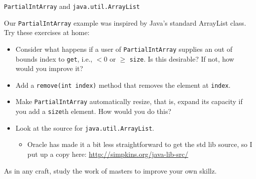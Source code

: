 \documentclass{beamer}
\begin{document}
\begin{frame}[fragile]{{\tt PartialIntArray} and {\tt java.util.ArrayList}}


Our {\tt PartialIntArray} example was inspired by Java's standard ArrayList class.  Try these exercises at home:
\begin{itemize}
\item Consider what happens if a user of {\tt PartialIntArray} supplies an out of bounds index to {\tt get}, i.e., $< 0$ or $\ge$ {\tt size}.  Is this desirable?  If not, how would you improve it?
\item Add a {\tt remove(int index)} method that removes the element at {\tt index}.
\item Make {\tt PartialIntArray} automatically resize, that is, expand its capacity if you add a {\tt size}th element.  How would you do this?
\item Look at the source for {\tt java.util.ArrayList}.
\begin{itemize}
\item Oracle has made it a bit less straightforward to get the std lib source, so I put up a copy here: \url{http://simpkins.org/java-lib-src/}
\end{itemize}
\end{itemize}

As in any craft, study the work of masters to improve your own skillz.

\end{frame}





\end{document}
